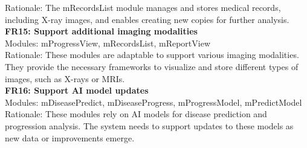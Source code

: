 \documentclass[12pt, titlepage]{article}
\begin{document}
Rationale: The mRecordsList module manages and stores medical records, including X-ray images, and enables creating new copies for further analysis. \\
\textbf{FR15: Support additional imaging modalities} \\
Modules: mProgressView, mRecordsList, mReportView \\
Rationale: These modules are adaptable to support various imaging modalities. They provide the necessary frameworks to visualize and store different types of images, such as X-rays or MRIs. \\
\textbf{FR16: Support AI model updates} \\
Modules: mDiseasePredict, mDiseaseProgress, mProgressModel, mPredictModel \\
Rationale: These modules rely on AI models for disease prediction and progression analysis. The system needs to support updates to these models as new data or improvements emerge. \\
\end{document}
